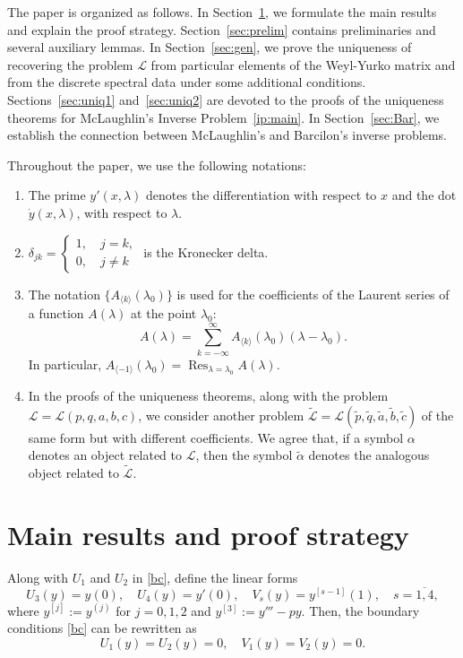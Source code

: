 \documentclass[a4paper,12pt]{article}
\newcommand{\al}{\alpha}
\newcommand{\de}{\delta}
\newcommand{\la}{\lambda}
\theoremstyle{plain}
\numberwithin{equation}{section}
\theoremstyle{definition}
\theoremstyle{remark}
\DeclareMathOperator*{\Res}{Res}
\begin{document}
The paper is organized as follows. In Section~\ref{sec:main}, we formulate the main results and explain the proof strategy. Section~\ref{sec:prelim} contains preliminaries and several auxiliary lemmas. In Section~\ref{sec:gen}, we prove the uniqueness of recovering the problem $\mathcal L$ from particular elements of the Weyl-Yurko matrix and from the discrete spectral data under some additional conditions. Sections~\ref{sec:uniq1} and~\ref{sec:uniq2} are devoted to the proofs of the uniqueness theorems for McLaughlin's Inverse Problem~\ref{ip:main}. In Section~\ref{sec:Bar}, we establish the connection between McLaughlin's and Barcilon's inverse problems.  

Throughout the paper, we use the following notations:
\begin{enumerate}
\item The prime $y'(x, \la)$ denotes the differentiation with respect to $x$ and the dot $\dot y(x, \la)$, with respect to $\la$.
\item $\de_{jk} = \begin{cases} 1, \quad j = k, \\ 0, \quad j \ne k\end{cases}$ is the Kronecker delta.
\item The notation $\{ A_{\langle k \rangle}(\la_0) \}$ is used for the coefficients of the Laurent series of a function $A(\la)$ at the point $\la_0$:
$$
A(\la) = \sum_{k = -\infty}^{\infty} A_{\langle k \rangle}(\la_0) (\la - \la_0).
$$
In particular, $A_{\langle -1 \rangle}(\la_0) = \Res_{\la = \la_0} A(\la)$.
\item In the proofs of the uniqueness theorems, along with the problem $\mathcal L = \mathcal L(p,q,a,b,c)$, we consider another problem $\tilde {\mathcal L} = \mathcal L(\tilde p, \tilde q, \tilde a, \tilde b, \tilde c)$ of the same form but with different coefficients. We agree that, if a symbol $\al$ denotes an object related to $\mathcal L$, then the symbol $\tilde \al$ denotes the analogous object related to $\tilde {\mathcal L}$.
\end{enumerate}

\section{Main results and proof strategy} \label{sec:main}

Along with $U_1$ and $U_2$ in \eqref{bc}, define the linear forms
\begin{equation} \label{defUV}
U_3(y) = y(0), \quad U_4(y) = y'(0), \quad V_s(y) = y^{[s-1]}(1), \quad s = \overline{1,4}, 
\end{equation}
where $y^{[j]} := y^{(j)}$ for $j = 0, 1, 2$ and $y^{[3]} := y''' - p y$.
Then, the boundary conditions \eqref{bc} can be rewritten as
\begin{equation} \label{bc2}
U_1(y) = U_2(y) = 0, \quad V_1(y) = V_2(y) = 0.
\end{equation}
\end{document}
